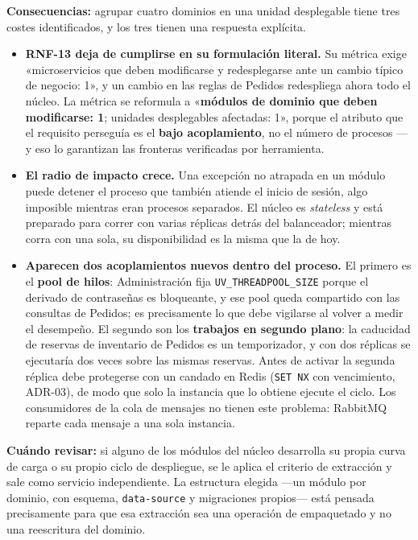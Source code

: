 \documentclass[11pt,a4paper]{article}
\begin{document}
\textbf{Consecuencias:} agrupar cuatro dominios en una unidad desplegable tiene tres costes
identificados, y los tres tienen una respuesta explícita.

\begin{itemize}
  \item \textbf{RNF-13 deja de cumplirse en su formulación literal.} Su métrica exige
        «microservicios que deben modificarse y redesplegarse ante un cambio típico de negocio:
        1», y un cambio en las reglas de Pedidos redespliega ahora todo el núcleo. La métrica se
        reformula a «\textbf{módulos de dominio que deben modificarse: 1}; unidades desplegables
        afectadas: 1», porque el atributo que el requisito perseguía es el \textbf{bajo
        acoplamiento}, no el número de procesos --- y eso lo garantizan las fronteras verificadas
        por herramienta.
  \item \textbf{El radio de impacto crece.} Una excepción no atrapada en un módulo puede detener el
        proceso que también atiende el inicio de sesión, algo imposible mientras eran procesos
        separados. El núcleo es \textit{stateless} y está preparado para correr con varias
        réplicas detrás del balanceador; mientras corra con una sola, su disponibilidad es la misma
        que la de hoy.
  \item \textbf{Aparecen dos acoplamientos nuevos dentro del proceso.} El primero es el
        \textbf{pool de hilos}: Administración fija \texttt{UV\_THREADPOOL\_SIZE} porque el derivado
        de contraseñas es bloqueante, y ese pool queda compartido con las consultas de Pedidos; es
        precisamente lo que debe vigilarse al volver a medir el desempeño. El segundo son los
        \textbf{trabajos en segundo plano}: la caducidad de reservas de inventario de Pedidos es un
        temporizador, y con dos réplicas se ejecutaría dos veces sobre las mismas reservas. Antes de
        activar la segunda réplica debe protegerse con un candado en Redis (\texttt{SET NX} con
        vencimiento, ADR-03), de modo que solo la instancia que lo obtiene ejecute el ciclo. Los
        consumidores de la cola de mensajes no tienen este problema: RabbitMQ reparte cada mensaje a
        una sola instancia.
\end{itemize}

\textbf{Cuándo revisar:} si alguno de los módulos del núcleo desarrolla su propia curva de carga o
su propio ciclo de despliegue, se le aplica el criterio de extracción y sale como servicio
independiente. La estructura elegida ---un módulo por dominio, con esquema, \texttt{data-source} y
migraciones propios--- está pensada precisamente para que esa extracción sea una operación de
empaquetado y no una reescritura del dominio.
\end{document}
